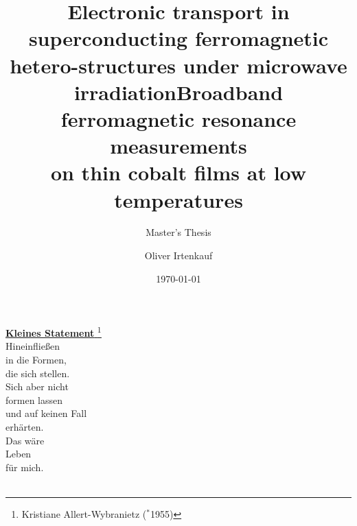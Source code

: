 \documentclass[11pt, rgb]{scrreprt}
\date{\today}
\author{Oliver Irtenkauf}
\title{Electronic transport in superconducting ferromagnetic hetero-structures under microwave irradiation}
\title{Broadband ferromagnetic resonance measurements\\on thin cobalt films at low temperatures}
\subtitle{Master's Thesis}
\newcommand\blankpage{
    \null
    \thispagestyle{empty}
    \addtocounter{page}{-1}
    \newpage
    }
\begin{document}





\newpage\null\vfill\begin{center}
{\underline{\textbf{Kleines Statement}
\footnote{Kristiane Allert-Wybranietz ($^*$1955)}}}%
\vspace{0.8cm}\\Hineinflie\ss en\\in die Formen,\\die sich stellen.\\
Sich aber nicht\\formen lassen\\und auf keinen Fall\\erhärten.\\
\vspace{2mm} Das wäre\\Leben\\für mich.\\\vspace{6cm}\ \\
\end{center}\vfill

\tableofcontents




\clearpage 
{}








\clearpage
{}


% 

\listoffigures

\begingroup
\let\clearpage\relax
\listoftables
\endgroup

\newpage
{}
\printbibliography[title={References}]


\end{document}
